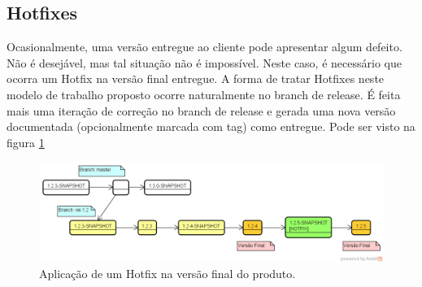 \subsection{Hotfixes}
\label{subsec:hotfixes}
Ocasionalmente, uma versão entregue ao cliente pode apresentar algum defeito. Não é desejável, mas tal situação não é impossível. Neste caso, é necessário que ocorra um Hotfix na versão final entregue. A forma de tratar Hotfixes neste modelo de trabalho proposto ocorre naturalmente no branch de release. É feita mais uma iteração de correção no branch de release e gerada uma nova versão documentada (opcionalmente marcada com tag) como entregue. Pode ser visto na figura \ref{fig:hotfix}

\begin{figure}[h!]
	\centering
	\includegraphics[width=0.7\linewidth]{img/branching_otojr_03}
	\caption[Hotfix na versão final]{Aplicação de um Hotfix na versão final do produto.}
	\label{fig:hotfix}
\end{figure}